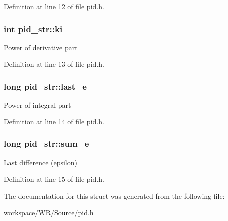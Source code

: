 Definition at line 12 of file pid.h.

\hypertarget{structpid__str_a1246caf4496665d0d9122ae001e9bbea}{
\subsubsection[{ki}]{\setlength{\rightskip}{0pt plus 5cm}int {\bf pid\_\-str::ki}}}
\label{structpid__str_a1246caf4496665d0d9122ae001e9bbea}
Power of derivative part 

Definition at line 13 of file pid.h.

\hypertarget{structpid__str_afba88804d3ae4faf2c06e0199d553745}{
\subsubsection[{last\_\-e}]{\setlength{\rightskip}{0pt plus 5cm}long {\bf pid\_\-str::last\_\-e}}}
\label{structpid__str_afba88804d3ae4faf2c06e0199d553745}
Power of integral part 

Definition at line 14 of file pid.h.

\hypertarget{structpid__str_ab5da6edeb8d607bf45f9be8330079120}{
\subsubsection[{sum\_\-e}]{\setlength{\rightskip}{0pt plus 5cm}long {\bf pid\_\-str::sum\_\-e}}}
\label{structpid__str_ab5da6edeb8d607bf45f9be8330079120}
Last difference (epsilon) 

Definition at line 15 of file pid.h.



The documentation for this struct was generated from the following file:\begin{DoxyCompactItemize}
\item 
workspace/WR/Source/\hyperlink{pid_8h}{pid.h}\end{DoxyCompactItemize}
